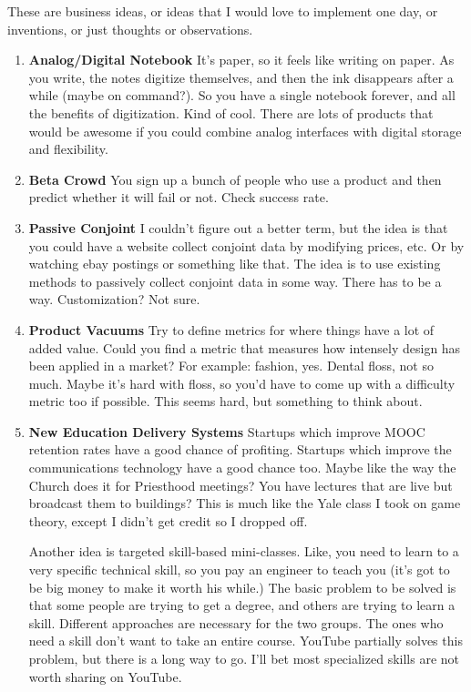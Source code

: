 \documentclass[paper=a4, fontsize=11pt]{scrartcl} %
\numberwithin{equation}{section} %
\numberwithin{figure}{section} %
\numberwithin{table}{section} %
\begin{document}
These are business ideas, or ideas that I would love to implement one day, or inventions, or just thoughts or observations.   

\begin{enumerate}

\item \textbf{Analog/Digital Notebook} It's paper, so it feels like writing on paper.  As you write, the notes digitize themselves, and then the ink disappears after a while (maybe on command?).  So you have a single notebook forever, and all the benefits of digitization.  Kind of cool.  There are lots of products that would be awesome if you could combine analog interfaces with digital storage and flexibility.  

\item \textbf{Beta Crowd} You sign up a bunch of people who use a product and then predict whether it will fail or not.  Check success rate.

\item \textbf{Passive Conjoint} I couldn't figure out a better term, but the idea is that you could have a website collect conjoint data by modifying prices, etc.  Or by watching ebay postings or something like that.  The idea is to use existing methods to passively collect conjoint data in some way.  There has to be a way.  Customization?  Not sure.

\item \textbf{Product Vacuums}  Try to define metrics for where things have a lot of added value.  Could you find a metric that measures how intensely design has been applied in a market?  For example: fashion, yes.  Dental floss, not so much.  Maybe it's hard with floss, so you'd have to come up with a difficulty metric too if possible.  This seems hard, but something to think about.

\item \textbf{New Education Delivery Systems}  Startups which improve MOOC retention rates have a good chance of profiting.  Startups which improve the communications technology have a good chance too.  Maybe like the way the Church does it for Priesthood meetings?  You have lectures that are live but broadcast them to buildings?  This is much like the Yale class I took on game theory, except I didn't get credit so I dropped off.  

Another idea is targeted skill-based mini-classes.  Like, you need to learn to a very specific technical skill, so you pay an engineer to teach you (it's got to be big money to make it worth his while.)  The basic problem to be solved is that some people are trying to get a degree, and others are trying to learn a skill.  Different approaches are necessary for the two groups.  The ones who need a skill don't want to take an entire course.  YouTube partially solves this problem, but there is a long way to go.  I'll bet most specialized skills are not worth sharing on YouTube.


\end{enumerate}
\end{document}

